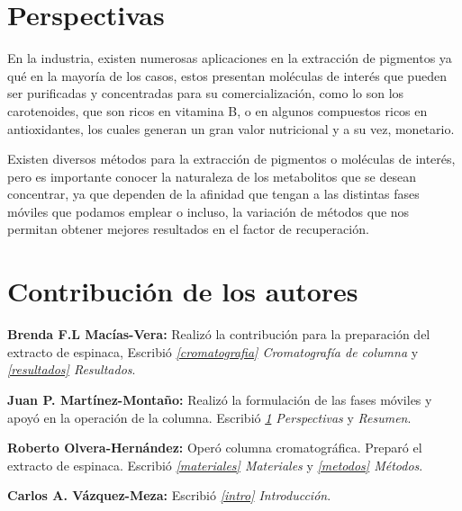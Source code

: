 \documentclass{ITESO-Report}
\begin{document}
\section{Perspectivas}\label{perspectivas}

En la industria, existen numerosas aplicaciones en la extracción de pigmentos ya qué en la mayoría de los casos, estos presentan moléculas de interés que pueden ser purificadas y concentradas para su comercialización, como lo son los carotenoides, que son ricos en vitamina B, o en algunos compuestos ricos en antioxidantes, los cuales generan un gran valor nutricional y a su vez, monetario.

Existen diversos métodos para la extracción de pigmentos o moléculas de interés, pero es importante conocer la naturaleza de los metabolitos que se desean concentrar, ya que dependen de la afinidad que tengan a las distintas fases móviles que podamos emplear o incluso, la variación de métodos que nos permitan obtener mejores resultados en el factor de recuperación.


\section{Contribución de los autores}
{\color{darkgray}\bfseries Brenda F.L Macías-Vera:}\hspace{1em}
Realizó la contribución para la preparación del extracto de espinaca, Escribió \textit{\ref{cromatografia} Cromatografía de columna} y \textit{\ref{resultados} Resultados}.

{\color{darkgray}\bfseries Juan P. Martínez-Montaño:}\hspace{1em}
Realizó la formulación de las fases móviles y apoyó en la operación de la columna. Escribió \textit{\ref{perspectivas} Perspectivas} y \textit{Resumen}.

{\color{darkgray}\bfseries Roberto Olvera-Hernández:}\hspace{1em}
Operó columna cromatográfica. Preparó el extracto de espinaca. Escribió \textit{\ref{materiales} Materiales} y \textit{\ref{metodos} Métodos}.

{\color{darkgray}\bfseries Carlos A. Vázquez-Meza:}\hspace{1em}
Escribió \textit{\ref{intro} Introducción}.

\printbibliography[title=Referencias citadas]
\end{document}
